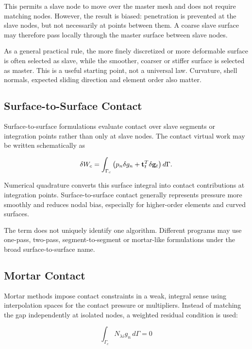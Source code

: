 This permits a slave node to move over the master mesh and does not require
matching nodes. However, the result is biased: penetration is prevented at the
slave nodes, but not necessarily at points between them. A coarse slave surface
may therefore pass locally through the master surface between slave nodes.

As a general practical rule, the more finely discretized or more deformable
surface is often selected as slave, while the smoother, coarser or stiffer
surface is selected as master. This is a useful starting point, not a universal
law. Curvature, shell normals, expected sliding direction and element order also
matter.

\subsection{Surface-to-Surface Contact}

Surface-to-surface formulations evaluate contact over slave segments or
integration points rather than only at slave nodes. The contact virtual work may
be written schematically as

\begin{equation}\label{contact-virtual-work}
    \delta W_c =
    \int_{\Gamma_c}
    \left( p_n \delta g_n
    + \mathbf{t}_t^T \delta \mathbf{g}_t \right) d\Gamma.
\end{equation}

Numerical quadrature converts this surface integral into contact contributions
at integration points. Surface-to-surface contact generally represents pressure
more smoothly and reduces nodal bias, especially for higher-order elements and
curved surfaces.

The term does not uniquely identify one algorithm. Different programs may use
one-pass, two-pass, segment-to-segment or mortar-like formulations under the
broad surface-to-surface name.

\subsection{Mortar Contact}

Mortar methods impose contact constraints in a weak, integral sense using
interpolation spaces for the contact pressure or multipliers. Instead of matching
the gap independently at isolated nodes, a weighted residual condition is used:

\begin{equation}
    \int_{\Gamma_c} N_{\lambda i} g_n \, d\Gamma = 0
\end{equation}

